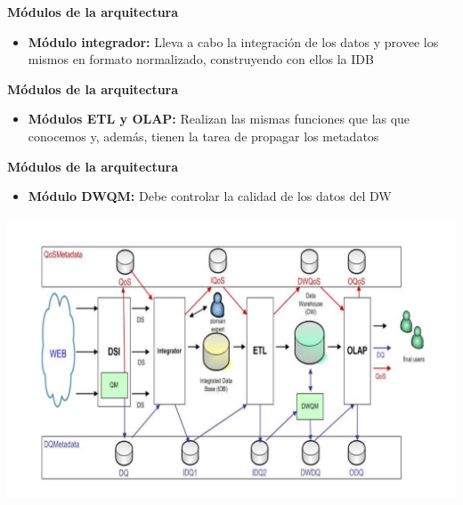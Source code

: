 \documentclass{fancyslides}
\begin{document}
\begin{frame}
\misc
{ \textbf{\Large Módulos de la arquitectura}
\newline
\newline

\begin{itemize}
  \item \textbf{Módulo integrador:} Lleva a cabo la integración de los datos y provee los mismos en formato normalizado, construyendo con ellos la IDB
\end{itemize}

}
\end{frame}

\begin{frame}
\misc
{ \textbf{\Large Módulos de la arquitectura}
\newline
\newline

\begin{itemize}
  \item \textbf{Módulos ETL y OLAP:} Realizan las mismas funciones que las que conocemos y, además, tienen la tarea de propagar los metadatos
\end{itemize}

}
\end{frame}

\begin{frame}
\misc
{ \textbf{\Large Módulos de la arquitectura}
\newline
\newline

\begin{itemize}
  \item \textbf{Módulo DWQM:} Debe controlar la calidad de los datos del DW
\end{itemize}

}
\end{frame}

\begin{frame}
\misc
{

\begin{center}
  \includegraphics[scale=0.15]{arquitectura}
\end{center}

}
\end{frame}
\end{document}
